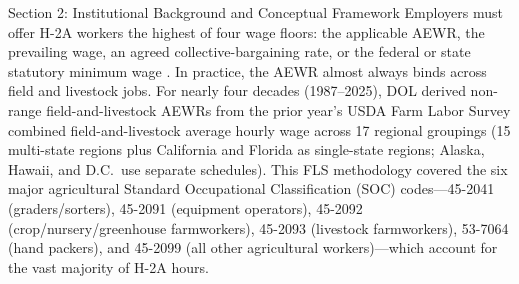 \begin{llmdraft}{Section 2: Institutional Background and Conceptual Framework}
Employers must offer H-2A workers the highest of four wage floors: the
applicable AEWR, the prevailing wage, an agreed collective-bargaining rate, or
the federal or state statutory minimum wage \citep{dol_aewr}. In practice, the
AEWR almost always binds across field and livestock jobs. For nearly four
decades (1987--2025), DOL derived non-range field-and-livestock AEWRs from the
prior year's USDA Farm Labor Survey combined field-and-livestock average hourly
wage across 17 regional groupings (15 multi-state regions plus California and
Florida as single-state regions; Alaska, Hawaii, and D.C.\ use separate
schedules). This FLS methodology covered the six major agricultural Standard
Occupational Classification (SOC) codes---45-2041 (graders/sorters), 45-2091
(equipment operators), 45-2092 (crop/nursery/greenhouse farmworkers), 45-2093
(livestock farmworkers), 53-7064 (hand packers), and 45-2099 (all other
agricultural workers)---which account for the vast majority of H-2A hours.


\end{llmdraft}
